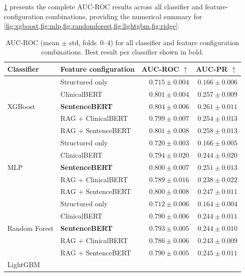 \cref{tab:full_results} presents the complete AUC-ROC results across all
classifier and feature-configuration combinations, providing the numerical
summary for \cref{fig:xgboost,fig:mlp,fig:randomforest,fig:lightgbm,fig:ridge}.

\begin{table}[ht]
\centering
\begin{threeparttable}
\caption{AUC-ROC (mean $\pm$ std, folds~0--4) for all classifier and feature
         configuration combinations. Best result per classifier shown in bold.
         \label{tab:full_results}}
\begin{tabular}{llrr}
\toprule
Classifier & Feature configuration & AUC-ROC $\uparrow$ & AUC-PR $\uparrow$ \\
\midrule
\multirow{5}{*}{XGBoost}
  & Structured only       & $0.715 \pm 0.004$ & $0.166 \pm 0.006$ \\
  & ClinicalBERT          & $0.801 \pm 0.004$ & $0.257 \pm 0.009$ \\
  & \textbf{SentenceBERT} & $\mathbf{0.804 \pm 0.006}$ & $\mathbf{0.261 \pm 0.011}$ \\
  & RAG + ClinicalBERT    & $0.799 \pm 0.007$ & $0.254 \pm 0.013$ \\
  & RAG + SentenceBERT    & $0.801 \pm 0.008$ & $0.258 \pm 0.013$ \\
\midrule
\multirow{5}{*}{MLP}
  & Structured only       & $0.720 \pm 0.003$ & $0.166 \pm 0.005$ \\
  & ClinicalBERT          & $0.794 \pm 0.020$ & $0.244 \pm 0.020$ \\
  & \textbf{SentenceBERT} & $\mathbf{0.800 \pm 0.007}$ & $\mathbf{0.251 \pm 0.013}$ \\
  & RAG + ClinicalBERT    & $0.789 \pm 0.016$ & $0.238 \pm 0.022$ \\
  & RAG + SentenceBERT    & $0.800 \pm 0.008$ & $0.247 \pm 0.011$ \\
\midrule
\multirow{5}{*}{Random Forest}
  & Structured only       & $0.712 \pm 0.006$ & $0.164 \pm 0.004$ \\
  & ClinicalBERT          & $0.790 \pm 0.006$ & $0.244 \pm 0.011$ \\
  & \textbf{SentenceBERT} & $\mathbf{0.793 \pm 0.005}$ & $\mathbf{0.244 \pm 0.010}$ \\
  & RAG + ClinicalBERT    & $0.786 \pm 0.006$ & $0.243 \pm 0.009$ \\
  & RAG + SentenceBERT    & $0.790 \pm 0.005$ & $0.245 \pm 0.011$ \\
\midrule
\multirow{5}{*}{LightGBM}

\end{tabular}
\end{threeparttable}
\end{table}
